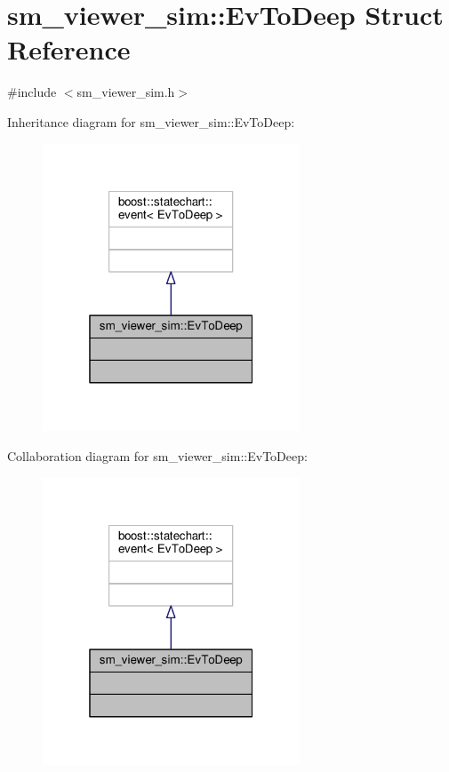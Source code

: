 \hypertarget{structsm__viewer__sim_1_1EvToDeep}{}\section{sm\+\_\+viewer\+\_\+sim\+:\+:Ev\+To\+Deep Struct Reference}
\label{structsm__viewer__sim_1_1EvToDeep}


{\ttfamily \#include $<$sm\+\_\+viewer\+\_\+sim.\+h$>$}



Inheritance diagram for sm\+\_\+viewer\+\_\+sim\+:\+:Ev\+To\+Deep\+:\nopagebreak
\begin{figure}[H]
\begin{center}
\leavevmode
\includegraphics[width=217pt]{structsm__viewer__sim_1_1EvToDeep__inherit__graph}
\end{center}
\end{figure}


Collaboration diagram for sm\+\_\+viewer\+\_\+sim\+:\+:Ev\+To\+Deep\+:\nopagebreak
\begin{figure}[H]
\begin{center}
\leavevmode
\includegraphics[width=217pt]{structsm__viewer__sim_1_1EvToDeep__coll__graph}
\end{center}
\end{figure}



